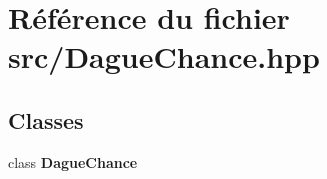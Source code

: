 \section{Référence du fichier src/\-Dague\-Chance.hpp}
\label{_dague_chance_8hpp}
\subsection*{Classes}
\begin{DoxyCompactItemize}
\item 
class {\bf Dague\-Chance}
\end{DoxyCompactItemize}
